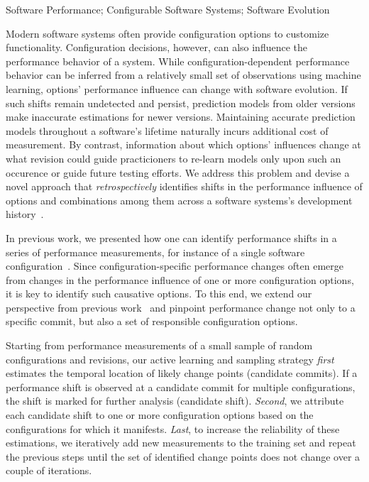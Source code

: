 \documentclass[utf8,biblatex]{lni}
\begin{document}
\begin{keywords}
Software Performance; Configurable Software Systems; Software Evolution
\end{keywords}

Modern software systems often provide configuration options to customize functionality. Configuration decisions, however, can also influence the performance behavior of a system. While configuration-dependent performance behavior can be inferred from a relatively small set of observations using machine learning, options' performance influence can change with software evolution. If such shifts remain undetected and persist, prediction models from older versions make inaccurate estimations for newer versions. Maintaining accurate prediction models throughout a software's lifetime naturally incurs additional cost of measurement. By contrast, information about which options' influences change at what revision could guide practicioners to re-learn models only upon such an occurence or guide future testing efforts. 
We address this problem and devise a novel approach that \textit{retrospectively} identifies shifts in the performance influence of options and combinations among them across a software systems’s development history~\cite{muehlbauer_identifying_2020}. 

In previous work, we presented how one can identify performance shifts in a series of performance measurements, for instance of a single software configuration~\cite{muhlbauer_accurate_2019}.
Since configuration-specific performance changes often emerge from changes in the performance influence of one or more configuration options, it is key to identify such causative options. To this end, we extend our perspective from previous work~\cite{muhlbauer_accurate_2019} and pinpoint performance change not only to a specific commit, but also a set of responsible configuration options. 

Starting from performance measurements of a small sample of random configurations and revisions, our active learning and sampling strategy \textit{first} estimates the temporal location of likely change points (candidate commits). If a performance shift is observed at a candidate commit for multiple configurations, the shift is marked for further analysis (candidate shift). \textit{Second}, we attribute each candidate shift to one or more configuration options based on the configurations for which it manifests. \textit{Last}, to increase the reliability of these estimations, we iteratively add new measurements to the training set and repeat the previous steps until the set of identified change points does not change over a couple of iterations.
\end{document}
